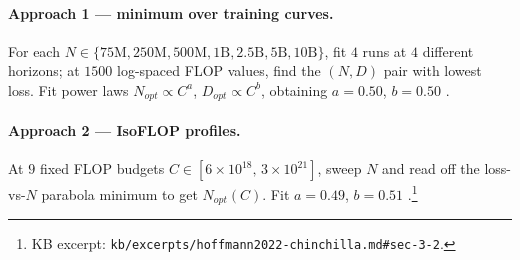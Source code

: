 \paragraph{Approach 1 --- minimum over training curves.}
For each $N \in \{75\text{M}, 250\text{M}, 500\text{M}, 1\text{B},
2.5\text{B}, 5\text{B}, 10\text{B}\}$, fit $4$ runs at $4$ different
horizons; at $1500$ log-spaced FLOP values, find the $(N, D)$ pair
with lowest loss. Fit power laws $N_{opt} \propto C^a$,
$D_{opt} \propto C^b$, obtaining $a = 0.50$, $b = 0.50$
\citep[\S 3.1]{hoffmann2022-chinchilla}.

\paragraph{Approach 2 --- IsoFLOP profiles.}
At $9$ fixed FLOP budgets $C \in [6 \times 10^{18},\, 3 \times 10^{21}]$,
sweep $N$ and read off the loss-vs-$N$ parabola minimum to get
$N_{opt}(C)$. Fit $a = 0.49$, $b = 0.51$
\citep[\S 3.2]{hoffmann2022-chinchilla}.\footnote{KB excerpt:
\texttt{kb/excerpts/hoffmann2022-chinchilla.md\#sec-3-2}.}

